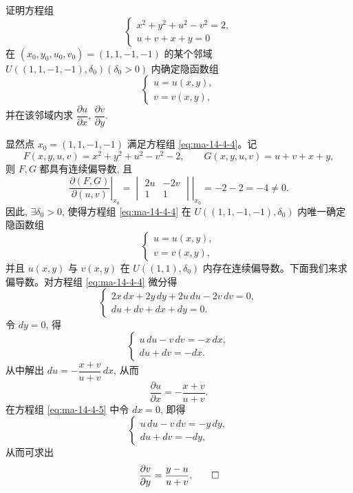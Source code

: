 \begin{example}\label{example:ma-14-4-3}
证明方程组
\begin{equation}
  \begin{cases}
    x^2+y^2+u^2-v^2=2,\\
    u+v+x+y=0
  \end{cases}
  \label{eq:ma-14-4-4}
\end{equation}
在 $(x_0,y_0,u_0,v_0)=(1,1,-1,-1)$ 的某个邻域 $U((1,1,-1,-1),\delta_0)(\delta_0>0)$ 内确定隐函数组
\[
  \begin{cases}
    u=u(x,y),\\
    v=v(x,y),
  \end{cases}
\]
并在该邻域内求 $\dfrac{\partial u}{\partial x}$, $\dfrac{\partial v}{\partial y}$.
\end{example}


\begin{solve}
显然点 $x_0=(1,1,-1,-1)$ 满足方程组 \eqref{eq:ma-14-4-4}。记
\[
  F(x,y,u,v)=x^2+y^2+u^2-v^2-2,
  \qquad
  G(x,y,u,v)=u+v+x+y,
\]
则 $F,G$ 都具有连续偏导数, 且
\[
  \left.
  \frac{\partial(F,G)}{\partial(u,v)}
  \right|_{x_0}
  =
  \left.
  \begin{vmatrix}
    2u & -2v\\
    1 & 1
  \end{vmatrix}
  \right|_{x_0}
  =-2-2=-4\ne0.
\]
因此, $\exists\delta_0>0$, 使得方程组 \eqref{eq:ma-14-4-4} 在 $U((1,1,-1,-1),\delta_0)$ 内唯一确定隐函数组
\[
  \begin{cases}
    u=u(x,y),\\
    v=v(x,y),
  \end{cases}
\]
并且 $u(x,y)$ 与 $v(x,y)$ 在 $U((1,1),\delta_0)$ 内存在连续偏导数。下面我们来求偏导数。对方程组 \eqref{eq:ma-14-4-4} 微分得
\begin{equation}
  \begin{cases}
    2x\,dx+2y\,dy+2u\,du-2v\,dv=0,\\
    du+dv+dx+dy=0.
  \end{cases}
  \label{eq:ma-14-4-5}
\end{equation}
令 $dy=0$, 得
\[
  \begin{cases}
    u\,du-v\,dv=-x\,dx,\\
    du+dv=-dx.
  \end{cases}
\]
从中解出 $du=-\dfrac{x+v}{u+v}\,dx$, 从而
\[
  \frac{\partial u}{\partial x}=-\frac{x+v}{u+v}.
\]
在方程组 \eqref{eq:ma-14-4-5} 中令 $dx=0$, 即得
\[
  \begin{cases}
    u\,du-v\,dv=-y\,dy,\\
    du+dv=-dy,
  \end{cases}
\]
从而可求出
\[
  \frac{\partial v}{\partial y}=\frac{y-u}{u+v}.
\qedhere
\]
\end{solve}


